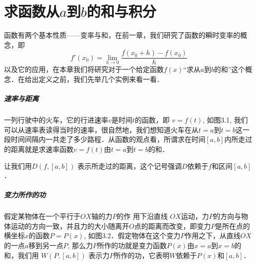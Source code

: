 \chapter{求函数从$a$到$b$的和与积分}
函数有两个基本性质——变率与和，在前一章，我们研究了函数的瞬时变率的概念，即
\[f'(x_0) =\lim_{h\to 0} \frac{f (x_0+h) -f (x_0)}{h}\]
以及它的应用，在本章我们将研究对于一个给定函数$f(x)$“求从$a$到$b$的和”这个概念．在给出定义之前，我们先举几个实例来看一看．

\paragraph{速率与距离} 
一列行驶中的火车，它的行进速率$v$是时间$t$的函数，即
$v=f(t)$, 如图3.1, 我们可以从速率表读得当时的速率，很自然地，我们想知道火车在从$t=a$到$t=b$这一段时间间隔内一共走了多少路程．从函数的观点看，所谓求在时间$[a,b]$内所走过的距离就是求速率函数$v=f(t)$由$t=a$到$t=b$的和．

\begin{figure}[htp]
    \centering
{}
    \caption{}
\end{figure}

让我们用$D(f,[a,b])$
表示所走过的距离，这个记号强调$D$依赖于$f$和区间$[a,b]$．

\paragraph{变力所作的功}

假定某物体在一个平行于$OX$轴的力$P$的作 用下沿直线
$OX$运动，力$P$的方向与物体运动的方向一致，并且力的大小随离开$O$点的距离而改变，即变力$P$是所在点的横坐标$x$的函数$P=P(x)$, 如图3.2．假定物体在这个变力$P$作用之下，从直线$OX$的一点$a$移到另一点$P$, 那么力$P$所作的功就是变力函数$P(x)$由$x=a$到$x=b$的和，我们用
$W (P, [a,b])$
表示力$P$所作的功，它表明$W$依赖于$P(x)$和$[a,b]$．


